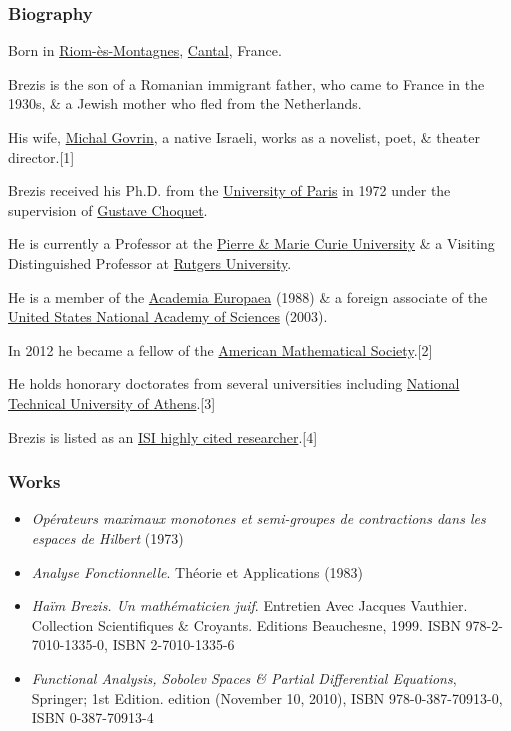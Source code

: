\documentclass{article}
\begin{document}
\subsubsection{Biography}
Born in \href{https://en.wikipedia.org/wiki/Riom-%C3%A8s-Montagnes}{Riom-ès-Montagnes}, \href{https://en.wikipedia.org/wiki/Cantal}{Cantal}, France.

Brezis is the son of a Romanian immigrant father, who came to France in the 1930s, \& a Jewish mother who fled from the Netherlands.

His wife, \href{https://en.wikipedia.org/wiki/Michal_Govrin}{Michal Govrin}, a native Israeli, works as a novelist, poet, \& theater director.[1]

Brezis received his Ph.D. from the \href{https://en.wikipedia.org/wiki/University_of_Paris}{University of Paris} in 1972 under the supervision of \href{https://en.wikipedia.org/wiki/Gustave_Choquet}{Gustave Choquet}.

He is currently a Professor at the \href{https://en.wikipedia.org/wiki/Pierre_and_Marie_Curie_University}{Pierre \& Marie Curie University} \& a Visiting Distinguished Professor at \href{https://en.wikipedia.org/wiki/Rutgers_University}{Rutgers University}.

He is a member of the \href{https://en.wikipedia.org/wiki/Academia_Europaea}{Academia Europaea} (1988) \& a foreign associate of the \href{https://en.wikipedia.org/wiki/United_States_National_Academy_of_Sciences}{United States National Academy of Sciences} (2003).

In 2012 he became a fellow of the \href{https://en.wikipedia.org/wiki/American_Mathematical_Society}{American Mathematical Society}.[2]

He holds honorary doctorates from several universities including \href{https://en.wikipedia.org/wiki/National_Technical_University_of_Athens}{National Technical University of Athens}.[3]

Brezis is listed as an \href{https://en.wikipedia.org/wiki/ISI_highly_cited_researcher}{ISI highly cited researcher}.[4]

\subsubsection{Works}
\begin{itemize}
	\item \textit{Opérateurs maximaux monotones et semi-groupes de contractions dans les espaces de Hilbert} (1973)
	\item \textit{Analyse Fonctionnelle}. Théorie et Applications (1983)
	\item \textit{Haïm Brezis. Un mathématicien juif}. Entretien Avec Jacques Vauthier. Collection Scientifiques \& Croyants. Editions Beauchesne, 1999. ISBN 978-2-7010-1335-0, ISBN 2-7010-1335-6
	\item \textit{Functional Analysis, Sobolev Spaces \& Partial Differential Equations}, Springer; 1st Edition. edition (November 10, 2010), ISBN 978-0-387-70913-0, ISBN 0-387-70913-4
\end{itemize}
\end{document}
